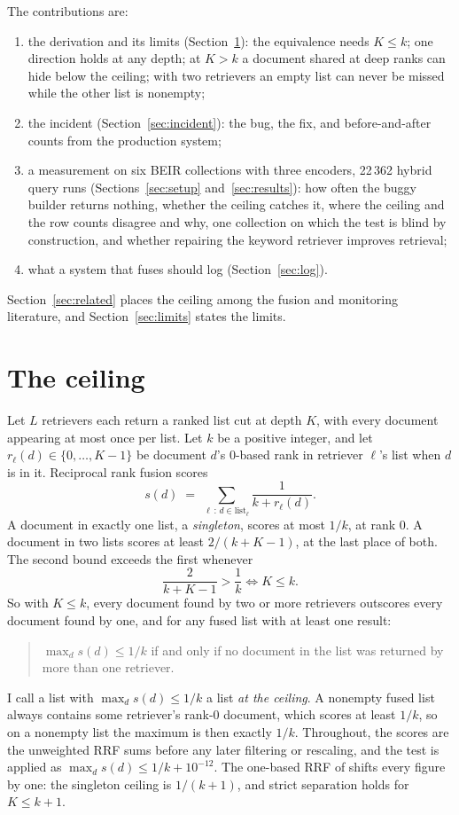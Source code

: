 \documentclass[11pt]{article}
\begin{document}
The contributions are:
\begin{enumerate}
\item the derivation and its limits (Section~\ref{sec:ceiling}): the equivalence needs $K \le k$; one direction holds at any depth; at $K > k$ a document shared at deep ranks can hide below the ceiling; with two retrievers an empty list can never be missed while the other list is nonempty;
\item the incident (Section~\ref{sec:incident}): the bug, the fix, and before-and-after counts from the production system;
\item a measurement on six BEIR collections with three encoders, 22\,362 hybrid query runs (Sections~\ref{sec:setup} and~\ref{sec:results}): how often the buggy builder returns nothing, whether the ceiling catches it, where the ceiling and the row counts disagree and why, one collection on which the test is blind by construction, and whether repairing the keyword retriever improves retrieval;
\item what a system that fuses should log (Section~\ref{sec:log}).
\end{enumerate}
Section~\ref{sec:related} places the ceiling among the fusion and monitoring literature, and Section~\ref{sec:limits} states the limits.

\section{The ceiling}
\label{sec:ceiling}

Let $L$ retrievers each return a ranked list cut at depth $K$, with every document appearing at most once per list. Let $k$ be a positive integer, and let $r_\ell(d) \in \{0, \ldots, K-1\}$ be document $d$'s 0-based rank in retriever $\ell$'s list when $d$ is in it. Reciprocal rank fusion scores
\[
  s(d) \;=\; \sum_{\ell \,:\, d \in \text{list}_\ell} \frac{1}{k + r_\ell(d)} .
\]
A document in exactly one list, a \emph{singleton}, scores at most $1/k$, at rank 0. A document in two lists scores at least $2/(k+K-1)$, at the last place of both. The second bound exceeds the first whenever
\[
  \frac{2}{k+K-1} > \frac{1}{k} \iff K \le k .
\]
So with $K \le k$, every document found by two or more retrievers outscores every document found by one, and for any fused list with at least one result:
\begin{quote}
$\max_d s(d) \le 1/k$ if and only if no document in the list was returned by more than one retriever.
\end{quote}
I call a list with $\max_d s(d) \le 1/k$ a list \emph{at the ceiling}. A nonempty fused list always contains some retriever's rank-0 document, which scores at least $1/k$, so on a nonempty list the maximum is then exactly $1/k$. Throughout, the scores are the unweighted RRF sums before any later filtering or rescaling, and the test is applied as $\max_d s(d) \le 1/k + 10^{-12}$. The one-based RRF of \citet{cormack2009rrf} shifts every figure by one: the singleton ceiling is $1/(k+1)$, and strict separation holds for $K \le k+1$.
\end{document}

